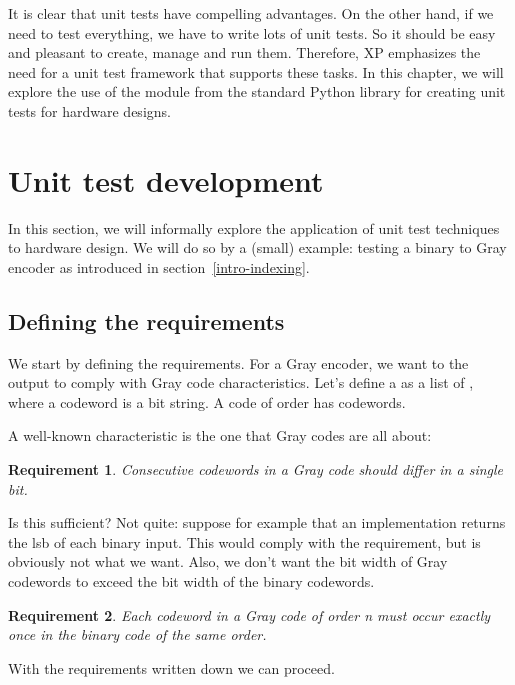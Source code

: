 It is clear that unit tests have compelling advantages. On the other
hand, if we need to test everything, we have to write
lots of unit tests. So it should be easy and pleasant
to create, manage and run them. Therefore, XP emphasizes the need for
a unit test framework that supports these tasks. In this chapter,
we will explore the use of the  module from
the standard Python library for creating unit tests for hardware
designs.


\section{Unit test development \label{unittest-dev}}

In this section, we will informally explore the application of unit
test techniques to hardware design. We will do so by a (small)
example: testing a binary to Gray encoder as introduced in
section~\ref{intro-indexing}. 

\subsection{Defining the requirements \label{unittest-req}}

We start by defining the requirements. For a Gray encoder, we want to
the output to comply with Gray code characteristics. Let's define a
 as a list of , where a codeword is a bit
string. A code of order  has  codewords.

A well-known characteristic is the one that Gray codes are all about:

\newtheorem{reqGray}{Requirement}
\begin{reqGray} 
Consecutive codewords in a Gray code should differ in a single bit.
\end{reqGray}

Is this sufficient? Not quite: suppose for example that an
implementation returns the lsb of each binary input. This would comply
with the requirement, but is obviously not what we want. Also, we don't
want the bit width of Gray codewords to exceed the bit width of the
binary codewords.

\begin{reqGray} 
Each codeword in a Gray code of order n must occur exactly once in the
binary code of the same order.
\end{reqGray}

With the requirements written down we can proceed.

